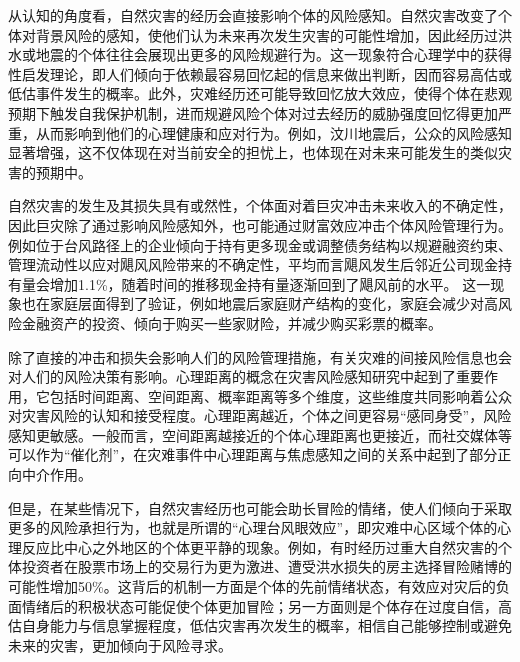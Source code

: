 从认知的角度看，自然灾害的经历会直接影响个体的风险感知。自然灾害改变了个体对背景风险的感知，使他们认为未来再次发生灾害的可能性增加\citep{dillenberger2015history,ZGRK202210006}，因此经历过洪水或地震的个体往往会展现出更多的风险规避行为\citep{cameron2015risk,cassar2017trust}。这一现象符合心理学中的获得性启发理论\citep{tversky1973availability,0Do}，即人们倾向于依赖最容易回忆起的信息来做出判断，因而容易高估或低估事件发生的概率。此外，灾难经历还可能导致回忆放大效应\citep{heir2009longitudinal,cheong2022natural}，使得个体在悲观预期下触发自我保护机制，进而规避风险个体对过去经历的威胁强度回忆得更加严重\citep{dillenberger2015history}，从而影响到他们的心理健康和应对行为。例如，汶川地震后，公众的风险感知显著增强，这不仅体现在对当前安全的担忧上，也体现在对未来可能发生的类似灾害的预期中\citep{李华强2009突发性灾害中的公众风险感知与应急管理,贾建民2008汶川地震重灾区与非重灾区民众风险感知对比分析}。

自然灾害的发生及其损失具有或然性，个体面对着巨灾冲击未来收入的不确定性，因此巨灾除了通过影响风险感知外，也可能通过财富效应冲击个体风险管理行为\citep{田玲2009中国财产保险业巨灾损失赔付能力实证研究}。例如位于台风路径上的企业倾向于持有更多现金\citep{0Do,杨娜娜2019自然灾害与企业现金持有}或调整债务结构\citep{shao2024typhoons}以规避融资约束、管理流动性以应对飓风风险带来的不确定性，平均而言飓风发生后邻近公司现金持有量会增加1.1\%，随着时间的推移现金持有量逐渐回到了飓风前的水平\citep{0Do}。
这一现象也在家庭层面得到了验证，例如地震后家庭财产结构的变化，家庭会减少对高风险金融资产的投资\citep{于也雯0财产和生命双重风险约束下的家庭资产选择,liu2022effect}、倾向于购买一些家财险，并减少购买彩票的概率\citep{章元0地震冲击对风险偏好的影响}。

除了直接的冲击和损失会影响人们的风险管理措施，有关灾难的间接风险信息也会对人们的风险决策有影响\citep{said2015risk}。心理距离的概念在灾害风险感知研究中起到了重要作用\citep{jin2013experimental}，它包括时间距离、空间距离、概率距离等多个维度，这些维度共同影响着公众对灾害风险的认知和接受程度\citep{尚志海2018基于心理距离的灾害可接受风险研究,mcdonald2015personal}。心理距离越近，个体之间更容易“感同身受”，风险感知更敏感\citep{尚志海2019基于心理距离的公众台风灾害风险感知比较分析,FZJS202102009}。一般而言，空间距离越接近的个体心理距离也更接近\citep{zhang2009psychological}，而社交媒体等可以作为“催化剂”，在灾难事件中心理距离与焦虑感知之间的关系中起到了部分正向中介作用\citep{FJSX202203012}。

但是，在某些情况下，自然灾害经历也可能会助长冒险的情绪，使人们倾向于采取更多的风险承担行为，也就是所谓的“心理台风眼效应”，即灾难中心区域个体的心理反应比中心之外地区的个体更平静的现象\citep{谢晓非2012心理台风眼效应研究综述}。例如，有时经历过重大自然灾害的个体投资者在股票市场上的交易行为更为激进\citep{bui2019natural}、遭受洪水损失的房主选择冒险赌博的可能性增加50\%\citep{page2012variation}。这背后的机制一方面是个体的先前情绪状态，有效应对灾后的负面情绪后的积极状态可能促使个体更加冒险\citep{bonanno2004loss}；另一方面则是个体存在过度自信，高估自身能力与信息掌握程度，低估灾害再次发生的概率，相信自己能够控制或避免未来的灾害，更加倾向于风险寻求\citep{王大伟2014先前情绪和过度自信对灾难事件后继风险决策的影响,ahmed2013managerial}。

